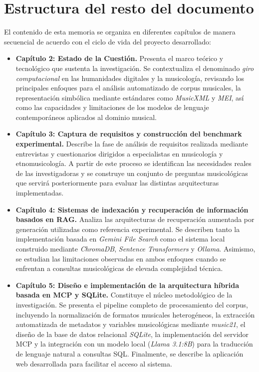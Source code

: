 \section{Estructura del resto del documento}
El contenido de esta memoria se organiza en diferentes capítulos de manera secuencial de acuerdo con el ciclo de vida del proyecto desarrollado:

\begin{itemize}
    \item \textbf{Capítulo 2: Estado de la Cuestión.} Presenta el marco teórico y tecnológico que sustenta la investigación. Se contextualiza el denominado \textit{giro computacional} en las humanidades digitales y la musicología, revisando los principales enfoques para el análisis automatizado de corpus musicales, la representación simbólica mediante estándares como \textit{MusicXML} y \textit{MEI}, así como las capacidades y limitaciones de los modelos de lenguaje contemporáneos aplicados al dominio musical.
    \item \textbf{Capítulo 3: Captura de requisitos y construcción del benchmark experimental.} Describe la fase de análisis de requisitos realizada mediante entrevistas y cuestionarios dirigidos a especialistas en musicología y etnomusicología. A partir de este proceso se identifican las necesidades reales de las investigadoras y se construye un conjunto de preguntas musicológicas que servirá posteriormente para evaluar las distintas arquitecturas implementadas.
    \item \textbf{Capítulo 4: Sistemas de indexación y recuperación de información basados en RAG.} Analiza las arquitecturas de recuperación aumentada por generación utilizadas como referencia experimental. Se describen tanto la implementación basada en \textit{Gemini File Search} como el sistema local construido mediante \textit{ChromaDB}, \textit{Sentence Transformers} y \textit{Ollama}. Asimismo, se estudian las limitaciones observadas en ambos enfoques cuando se enfrentan a consultas musicológicas de elevada complejidad técnica.
    \item \textbf{Capítulo 5: Diseño e implementación de la arquitectura híbrida basada en MCP y SQLite.} Constituye el núcleo metodológico de la investigación. Se presenta el pipeline completo de procesamiento del corpus, incluyendo la normalización de formatos musicales heterogéneos, la extracción automatizada de metadatos y variables musicológicas mediante \textit{music21}, el diseño de la base de datos relacional \textit{SQLite}, la implementación del servidor MCP y la integración con un modelo local (\textit{Llama 3.1:8B}) para la traducción de lenguaje natural a consultas SQL. Finalmente, se describe la aplicación web desarrollada para facilitar el acceso al sistema.

\end{itemize}
